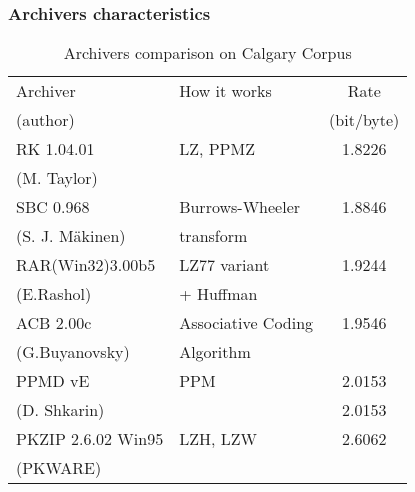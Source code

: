 \documentclass[14pt]{beamer}
\begin{document}
\begin{frame}
\frametitle{Archivers characteristics}
\begin{itemize}    


    \begin{table}[htbp]
    \begin{center}
    \caption{Archivers comparison on Calgary Corpus}
    \scalebox{0.6} {
    \begin{tabular}
    {|l|l|c|}
    \hline %
    Archiver & How it works & Rate \\
    (author)   &               & (bit/byte) \\ \hline %
    RK 1.04.01 & LZ, PPMZ & 1.8226 \\
    (M. Taylor)&    &         \\   \hline %
    SBC 0.968  & Burrows-Wheeler &  1.8846 \\
    (S. J. M\"{a}kinen)& transform & \\ \hline %
    RAR(Win32)3.00b5 & LZ77 variant &1.9244 \\
    (E.Rashol)       &  + Huffman &  \\   \hline %
    ACB 2.00c & Associative Coding &1.9546 \\
    (G.Buyanovsky)& Algorithm& \\  \hline %
    PPMD vE & PPM& 2.0153 \\   %
    (D. Shkarin) &     & 2.0153 \\ \hline %
    PKZIP 2.6.02 Win95& LZH, LZW&
    2.6062 \\
    (PKWARE)& &   \\\hline %
    \end{tabular}
    }
    \label{tab4_11}
    \end{center}
    \end{table}


\end{itemize}
\end{frame}
\end{document}
